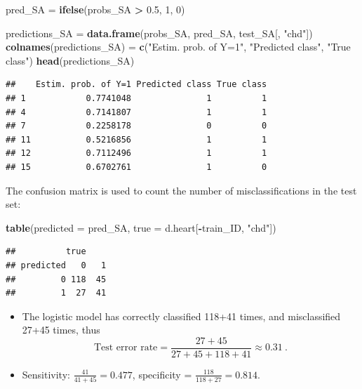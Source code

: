 \documentclass[
  10pt,
  ignorenonframetext,
]{beamer}
\newenvironment{Shaded}{\begin{snugshade}}{\end{snugshade}}
\newcommand{\AttributeTok}[1]{\textcolor[rgb]{0.13,0.29,0.53}{#1}}
\newcommand{\DecValTok}[1]{\textcolor[rgb]{0.00,0.00,0.81}{#1}}
\newcommand{\FloatTok}[1]{\textcolor[rgb]{0.00,0.00,0.81}{#1}}
\newcommand{\FunctionTok}[1]{\textcolor[rgb]{0.13,0.29,0.53}{\textbf{#1}}}
\newcommand{\NormalTok}[1]{#1}
\newcommand{\OtherTok}[1]{\textcolor[rgb]{0.56,0.35,0.01}{#1}}
\newcommand{\SpecialCharTok}[1]{\textcolor[rgb]{0.81,0.36,0.00}{\textbf{#1}}}
\newcommand{\StringTok}[1]{\textcolor[rgb]{0.31,0.60,0.02}{#1}}
\providecommand{\tightlist}{%
  \setlength{\itemsep}{0pt}\setlength{\parskip}{0pt}}
\begin{document}
\begin{frame}[fragile]
\scriptsize

\begin{Shaded}
\begin{Highlighting}[]
\NormalTok{pred\_SA }\OtherTok{=} \FunctionTok{ifelse}\NormalTok{(probs\_SA }\SpecialCharTok{\textgreater{}} \FloatTok{0.5}\NormalTok{, }\DecValTok{1}\NormalTok{, }\DecValTok{0}\NormalTok{)}

\NormalTok{predictions\_SA }\OtherTok{=} \FunctionTok{data.frame}\NormalTok{(probs\_SA, pred\_SA, test\_SA[, }\StringTok{"chd"}\NormalTok{])}
\FunctionTok{colnames}\NormalTok{(predictions\_SA) }\OtherTok{=} \FunctionTok{c}\NormalTok{(}\StringTok{"Estim. prob. of Y=1"}\NormalTok{, }\StringTok{"Predicted class"}\NormalTok{,}
    \StringTok{"True class"}\NormalTok{)}
\FunctionTok{head}\NormalTok{(predictions\_SA)}
\end{Highlighting}
\end{Shaded}

\begin{verbatim}
##    Estim. prob. of Y=1 Predicted class True class
## 1            0.7741048               1          1
## 4            0.7141807               1          1
## 7            0.2258178               0          0
## 11           0.5216856               1          1
## 12           0.7112496               1          1
## 15           0.6702761               1          0
\end{verbatim}
\end{frame}

\begin{frame}[fragile]
The confusion matrix is used to count the number of misclassifications
in the test set:

\vspace{2mm}

\scriptsize

\begin{Shaded}
\begin{Highlighting}[]
\FunctionTok{table}\NormalTok{(}\AttributeTok{predicted =}\NormalTok{ pred\_SA, }\AttributeTok{true =}\NormalTok{ d.heart[}\SpecialCharTok{{-}}\NormalTok{train\_ID, }\StringTok{"chd"}\NormalTok{])}
\end{Highlighting}
\end{Shaded}

\begin{verbatim}
##          true
## predicted   0   1
##         0 118  45
##         1  27  41
\end{verbatim}

\vspace{2mm}

\normalsize

\begin{itemize}
\tightlist
\item
  The logistic model has correctly classified 118+41 times, and
  misclassified 27+45 times, thus
  \[\text{Test error rate} = \frac{27+45}{27+45+118+41} \approx 0.31 \ .\]
\item
  Sensitivity: \(\frac{41}{41+45}=0.477\), specificity =
  \(\frac{118}{118+27}=0.814.\)
\end{itemize}
\end{frame}
\end{document}
